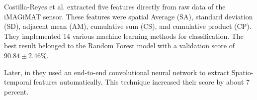 Costilla-Reyes et al. \cite{Costilla-Reyes2016TemporalSystem} extracted five features directly from raw data of the iMAGiMAT sensor. These features were spatial Average (SA), standard deviation (SD), adjacent mean (AM), cumulative sum (CS), and cumulative product (CP).
They implemented 14 various machine learning methods for classification. The best result belonged to the Random Forest model with a validation score of $90.84 \pm 2.46\%$. 

Later, in \cite{Costilla-Reyes2018DeepSensors} they used an end-to-end convolutional neural network to extract Spatio-temporal features automatically. This technique increased their score by about 7 percent.

